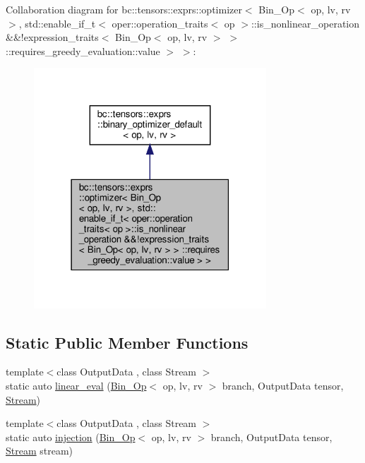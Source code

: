 Collaboration diagram for bc\+:\+:tensors\+:\+:exprs\+:\+:optimizer$<$ Bin\+\_\+\+Op$<$ op, lv, rv $>$, std\+:\+:enable\+\_\+if\+\_\+t$<$ oper\+:\+:operation\+\_\+traits$<$ op $>$\+:\+:is\+\_\+nonlinear\+\_\+operation \&\&!expression\+\_\+traits$<$ Bin\+\_\+\+Op$<$ op, lv, rv $>$ $>$ \+:\+:requires\+\_\+greedy\+\_\+evaluation\+:\+:value $>$ $>$\+:\nopagebreak
\begin{figure}[H]
\begin{center}
\leavevmode
\includegraphics[width=247pt]{structbc_1_1tensors_1_1exprs_1_1optimizer_3_01Bin__Op_3_01op_00_01lv_00_01rv_01_4_00_01std_1_1en8ca35632d7df3efb340a86bbba1e4a9b}
\end{center}
\end{figure}
\subsection*{Static Public Member Functions}
\begin{DoxyCompactItemize}
\item 
{\footnotesize template$<$class Output\+Data , class Stream $>$ }\\static auto \hyperlink{structbc_1_1tensors_1_1exprs_1_1optimizer_3_01Bin__Op_3_01op_00_01lv_00_01rv_01_4_00_01std_1_1enfb9b185ed6056cdbdfe04ef149dd3f73_ac1605c9de22c1c0d218c75c10cfa77f0}{linear\+\_\+eval} (\hyperlink{structbc_1_1tensors_1_1exprs_1_1Bin__Op}{Bin\+\_\+\+Op}$<$ op, lv, rv $>$ branch, Output\+Data tensor, \hyperlink{classbc_1_1streams_1_1Stream}{Stream})
\item 
{\footnotesize template$<$class Output\+Data , class Stream $>$ }\\static auto \hyperlink{structbc_1_1tensors_1_1exprs_1_1optimizer_3_01Bin__Op_3_01op_00_01lv_00_01rv_01_4_00_01std_1_1enfb9b185ed6056cdbdfe04ef149dd3f73_af070a02556ed4209581eea2d1760dbaa}{injection} (\hyperlink{structbc_1_1tensors_1_1exprs_1_1Bin__Op}{Bin\+\_\+\+Op}$<$ op, lv, rv $>$ branch, Output\+Data tensor, \hyperlink{classbc_1_1streams_1_1Stream}{Stream} stream)
\end{DoxyCompactItemize}
